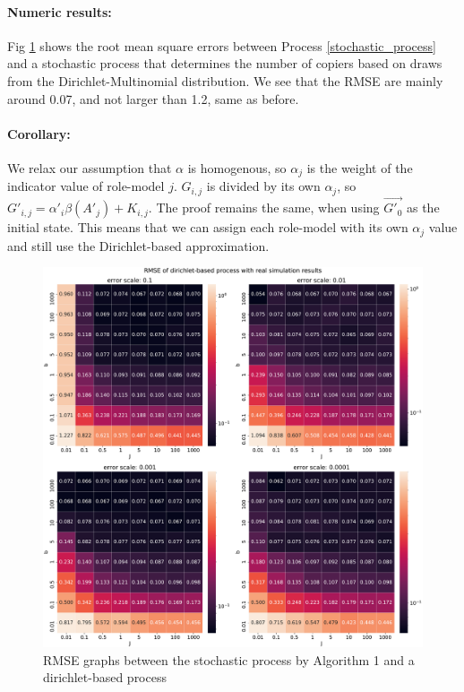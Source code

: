 \documentclass[11pt]{article}
\begin{document}
\paragraph{Numeric results:}
Fig \ref{dirichlet_rmse} shows the root mean square errors between Process \ref{stochastic_process} and a stochastic process that determines the number of copiers based on draws from the Dirichlet-Multinomial distribution.
We see that the RMSE are mainly around 0.07, and not larger than 1.2, same as before.

\paragraph{Corollary:} We relax our assumption that $\alpha$ is homogenous, so $\alpha_j$ is the weight of the indicator value of role-model $j$.
$G_{i,j}$ is divided by its own $\alpha_j$, so $G'_{i,j}=\alpha'_i\beta(A'_j) + K_{i,j}$.
The proof remains the same, when using $\overrightarrow{G'_{0}}$ as the initial state. 
This means that we can assign each role-model with its own $\alpha_j$ value and still use the Dirichlet-based approximation.

\begin{figure}
    \includegraphics[width=\linewidth]{dirichlet_rmse_heatmap.pdf}
    \caption{RMSE graphs between the stochastic process by Algorithm 1 and a dirichlet-based process}
    \label{dirichlet_rmse}
\end{figure}



\clearpage


\end{document}
